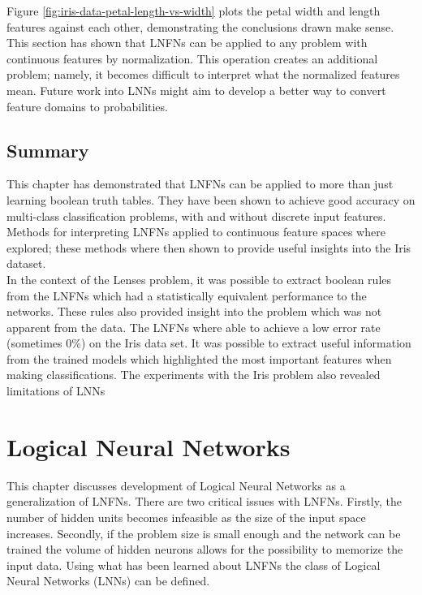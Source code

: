 Figure \ref{fig:iris-data-petal-length-vs-width} plots the petal width and length features against each other, demonstrating the conclusions drawn make sense.\\

This section has shown that LNFNs can be applied to any problem with continuous features by normalization. This operation creates an additional problem; namely, it becomes difficult to interpret what the normalized features mean. Future work into LNNs might aim to develop a better way to convert feature domains to probabilities.

\section{Summary}
This chapter has demonstrated that LNFNs can be applied to more than just learning boolean truth tables. They have been shown to achieve good accuracy on multi-class classification problems, with and without discrete input features. Methods for interpreting LNFNs applied to continuous feature spaces where explored; these methods where then shown to provide useful insights into the Iris dataset.\\

In the context of the Lenses problem, it was possible to extract boolean rules from the LNFNs which had a statistically equivalent performance to the networks. These rules also provided insight into the problem which was not apparent from the data. The LNFNs where able to achieve a low error rate (sometimes 0\%) on the Iris data set. It was possible to extract useful information from the trained models which highlighted the most important features when making classifications. The experiments with the Iris problem also revealed limitations of LNNs

\chapter{Logical Neural Networks} \label{C:lnn}
This chapter discusses development of Logical Neural Networks as a generalization of LNFNs. There are two critical issues with LNFNs. Firstly, the number of hidden units becomes infeasible as the size of the input space increases. Secondly, if the problem size is small enough and the network can be trained the volume of hidden neurons allows for the possibility to memorize the input data. Using what has been learned about LNFNs the class of Logical Neural Networks (LNNs) can be defined.

